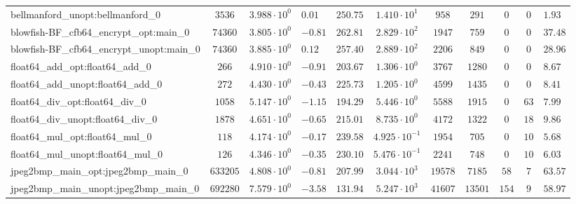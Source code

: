 \begin{tabular}{|l|c|HHc|c|c|c|c|cH|}
bellmanford\_unopt:bellmanford\_0               & $ 3536     $ & $ 3.988 \cdot 10^{0} $ & $ 0.01  $ & $ 250.75 $ & $ 1.410 \cdot 10^{1}  $ & $ 958    $ & $ 291   $ & $ 0   $ & $ 0   $ & $ 1.93    $ \\
blowfish-BF\_cfb64\_encrypt\_opt:main\_0        & $ 74360    $ & $ 3.805 \cdot 10^{0} $ & $ -0.81 $ & $ 262.81 $ & $ 2.829 \cdot 10^{2}  $ & $ 1947   $ & $ 759   $ & $ 0   $ & $ 0   $ & $ 37.48   $ \\
blowfish-BF\_cfb64\_encrypt\_unopt:main\_0      & $ 74360    $ & $ 3.885 \cdot 10^{0} $ & $ 0.12  $ & $ 257.40 $ & $ 2.889 \cdot 10^{2}  $ & $ 2206   $ & $ 849   $ & $ 0   $ & $ 0   $ & $ 28.96   $ \\
float64\_add\_opt:float64\_add\_0               & $ 266      $ & $ 4.910 \cdot 10^{0} $ & $ -0.91 $ & $ 203.67 $ & $ 1.306 \cdot 10^{0}  $ & $ 3767   $ & $ 1280  $ & $ 0   $ & $ 0   $ & $ 8.67    $ \\
float64\_add\_unopt:float64\_add\_0             & $ 272      $ & $ 4.430 \cdot 10^{0} $ & $ -0.43 $ & $ 225.73 $ & $ 1.205 \cdot 10^{0}  $ & $ 4599   $ & $ 1435  $ & $ 0   $ & $ 0   $ & $ 8.41    $ \\
float64\_div\_opt:float64\_div\_0               & $ 1058     $ & $ 5.147 \cdot 10^{0} $ & $ -1.15 $ & $ 194.29 $ & $ 5.446 \cdot 10^{0}  $ & $ 5588   $ & $ 1915  $ & $ 0   $ & $ 63  $ & $ 7.99    $ \\
float64\_div\_unopt:float64\_div\_0             & $ 1878     $ & $ 4.651 \cdot 10^{0} $ & $ -0.65 $ & $ 215.01 $ & $ 8.735 \cdot 10^{0}  $ & $ 4172   $ & $ 1322  $ & $ 0   $ & $ 18  $ & $ 9.86    $ \\
float64\_mul\_opt:float64\_mul\_0               & $ 118      $ & $ 4.174 \cdot 10^{0} $ & $ -0.17 $ & $ 239.58 $ & $ 4.925 \cdot 10^{-1} $ & $ 1954   $ & $ 705   $ & $ 0   $ & $ 10  $ & $ 5.68    $ \\
float64\_mul\_unopt:float64\_mul\_0             & $ 126      $ & $ 4.346 \cdot 10^{0} $ & $ -0.35 $ & $ 230.10 $ & $ 5.476 \cdot 10^{-1} $ & $ 2241   $ & $ 748   $ & $ 0   $ & $ 10  $ & $ 6.03    $ \\
jpeg2bmp\_main\_opt:jpeg2bmp\_main\_0           & $ 633205   $ & $ 4.808 \cdot 10^{0} $ & $ -0.81 $ & $ 207.99 $ & $ 3.044 \cdot 10^{3}  $ & $ 19578  $ & $ 7185  $ & $ 58  $ & $ 7   $ & $ 63.57   $ \\
jpeg2bmp\_main\_unopt:jpeg2bmp\_main\_0         & $ 692280   $ & $ 7.579 \cdot 10^{0} $ & $ -3.58 $ & $ 131.94 $ & $ 5.247 \cdot 10^{3}  $ & $ 41607  $ & $ 13501 $ & $ 154 $ & $ 9   $ & $ 58.97   $ \\

\end{tabular}
